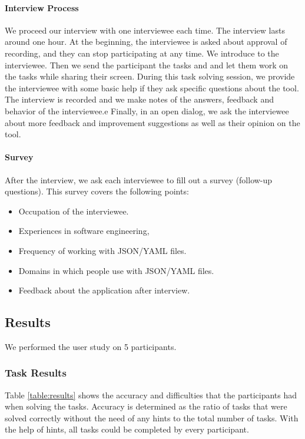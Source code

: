 
\paragraph{Interview Process}
We proceed our interview with one interviewee each time.
The interview lasts around one hour.
At the beginning, the interviewee is asked about approval of recording, and they can stop participating at any time.
We introduce \toolname{} to the interviewee.
Then we send the participant the tasks and \cfgfile{} and let them work on the tasks while sharing their screen.
During this task solving session, we provide the interviewee with some basic help if they ask specific questions about the tool.
The interview is recorded and we make notes of the answers, feedback and behavior of the interviewee.e
Finally, in an open dialog, we ask the interviewee about more feedback and improvement suggestions as well as their opinion on the tool.

\paragraph{Survey}
After the interview, we ask each interviewee to fill out a survey (follow-up questions).
This survey covers the following points:
\begin{itemize}
    \item Occupation of the interviewee.
    \item Experiences in software engineering,
    \item Frequency of working with JSON/YAML files.
    \item Domains in which people use with JSON/YAML files.
    \item Feedback about the application after interview.
\end{itemize}

\subsection{Results}
We performed the user study on 5 participants.

\subsubsection{Task Results}
Table \ref{table:results} shows the accuracy and difficulties that the participants had when solving the tasks.
Accuracy is determined as the ratio of tasks that were solved correctly without the need of any hints to the total number of tasks.
With the help of hints, all tasks could be completed by every participant.

